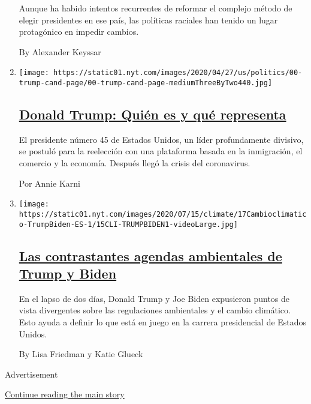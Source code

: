 \begin{enumerate}
  Aunque ha habido intentos recurrentes de reformar el complejo método
  de elegir presidentes en ese país, las políticas raciales han tenido
  un lugar protagónico en impedir cambios.

  By Alexander Keyssar
\item
  \texttt{[image: https://static01.nyt.com/images/2020/04/27/us/politics/00-trump-cand-page/00-trump-cand-page-mediumThreeByTwo440.jpg]}

  \hypertarget{donald-trump-quiuxe9n-es-y-quuxe9-representa}{%
  \subsection{\texorpdfstring{\href{/es/interactive/2020/espanol/estados-unidos/donald-trump-elecciones.html}{Donald
  Trump: Quién es y qué
  representa}}{Donald Trump: Quién es y qué representa}}\label{donald-trump-quiuxe9n-es-y-quuxe9-representa}}

  El presidente número 45 de Estados Unidos, un líder profundamente
  divisivo, se postuló para la reelección con una plataforma basada en
  la inmigración, el comercio y la economía. Después llegó la crisis del
  coronavirus.

  Por Annie Karni
\item
  \texttt{[image: https://static01.nyt.com/images/2020/07/15/climate/17Cambioclimatico-TrumpBiden-ES-1/15CLI-TRUMPBIDEN1-videoLarge.jpg]}

  \hypertarget{las-contrastantes-agendas-ambientales-de-trump-y-biden}{%
  \subsection{\texorpdfstring{\href{/es/2020/07/17/espanol/estados-unidos/cambio-climatico-trump-biden.html}{Las
  contrastantes agendas ambientales de Trump y
  Biden}}{Las contrastantes agendas ambientales de Trump y Biden}}\label{las-contrastantes-agendas-ambientales-de-trump-y-biden}}

  En el lapso de dos días, Donald Trump y Joe Biden expusieron puntos de
  vista divergentes sobre las regulaciones ambientales y el cambio
  climático. Esto ayuda a definir lo que está en juego en la carrera
  presidencial de Estados Unidos.

  By Lisa Friedman y Katie Glueck
\end{enumerate}

Advertisement

\protect\hyperlink{after-mid2}{Continue reading the main story}


